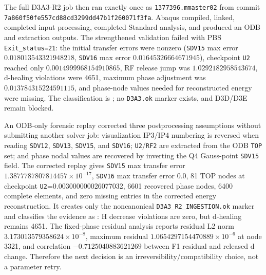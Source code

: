 The full D3A3-R2 job then ran exactly once as
\texttt{1377396.mmaster02} from commit
\texttt{7a860f50fe557cd88cd3299dd47b1f260071f3fa}. Abaqus compiled, linked,
completed input processing, completed Standard analysis, and produced an ODB
and extraction outputs. The strengthened validation failed with PBS
\texttt{Exit\_status=21}: the initial transfer errors were nonzero
(\texttt{SDV15} max error $0.018013543321948218$, \texttt{SDV16} max error
$0.01645326664671945$), checkpoint \texttt{U2} reached only
$0.0014999968154910865$, RF release jump was $1.0292182958543674$,
d-healing violations were 4651, maximum phase adjustment was
$0.013784315224591115$, and phase-node values needed for reconstructed energy
were missing. The classification is
; no \texttt{D3A3.ok} marker exists,
and D3D/D3E remain blocked.

An ODB-only forensic replay corrected three postprocessing assumptions without
submitting another solver job: visualization IP3/IP4 numbering is reversed when
reading \texttt{SDV12}, \texttt{SDV13}, \texttt{SDV15}, and \texttt{SDV16};
\texttt{U2}/\texttt{RF2} are extracted from the ODB \texttt{TOP} set; and
phase nodal values are recovered by inverting the Q4 Gauss-point
\texttt{SDV15} field. The corrected replay gives \texttt{SDV15} max transfer
error $1.3877787807814457\times10^{-17}$, \texttt{SDV16} max transfer error
$0.0$, 81 TOP nodes at checkpoint \texttt{U2}=0.003000000026077032, 6601
recovered phase nodes, 6400 complete elements, and zero missing entries in the
corrected energy reconstruction. It creates only the noncanonical
\texttt{D3A3\_R2\_INGESTION.ok} marker and classifies the evidence as
: H decrease
violations are zero, but d-healing remains 4651. The fixed-phase residual
analysis reports residual L2 norm $3.173013579358624\times10^{-8}$, maximum
residual $1.0654297154470889\times10^{-6}$ at node 3321, and correlation
$-0.7125040883621269$ between F1 residual and released d change. Therefore the
next decision is an irreversibility/compatibility choice, not a parameter
retry.

